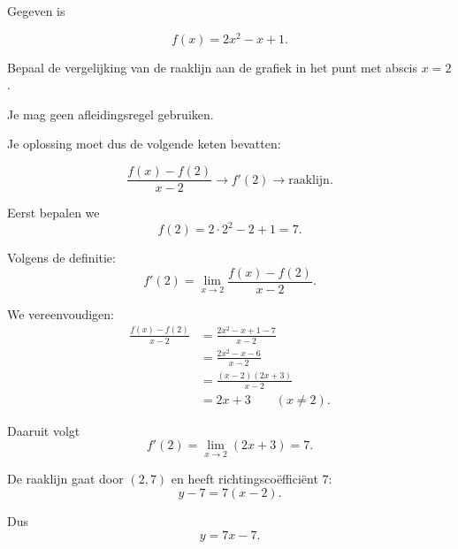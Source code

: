 \documentclass{ximera}
\begin{document}

\begin{oefening}{\oefU\ESS}

Gegeven is

\[
f(x)=2x^2-x+1.
\]

Bepaal de vergelijking van de raaklijn aan de grafiek in het punt
met abscis $x=2$.

Je mag geen afleidingsregel gebruiken.

Je oplossing moet dus de volgende keten bevatten:

\[
\frac{f(x)-f(2)}{x-2}
\longrightarrow
f'(2)
\longrightarrow
\text{raaklijn}.
\]

\begin{oplossing}

Eerst bepalen we
\[
f(2)=2\cdot2^2-2+1=7.
\]

Volgens de definitie:
\[
f'(2)
=
\lim_{x\to2}
\frac{f(x)-f(2)}{x-2}.
\]

We vereenvoudigen:
\[
\begin{aligned}
\frac{f(x)-f(2)}{x-2}
&=
\frac{2x^2-x+1-7}{x-2}\\
&=
\frac{2x^2-x-6}{x-2}\\
&=
\frac{(x-2)(2x+3)}{x-2}\\
&=
2x+3
\qquad (x\neq2).
\end{aligned}
\]

Daaruit volgt
\[
f'(2)
=
\lim_{x\to2}(2x+3)
=
7.
\]

De raaklijn gaat door $(2,7)$ en heeft richtingscoëfficiënt $7$:
\[
y-7=7(x-2).
\]

Dus
\[
\boxed{y=7x-7}.
\]

\end{oplossing}

\end{oefening}


\end{document}
